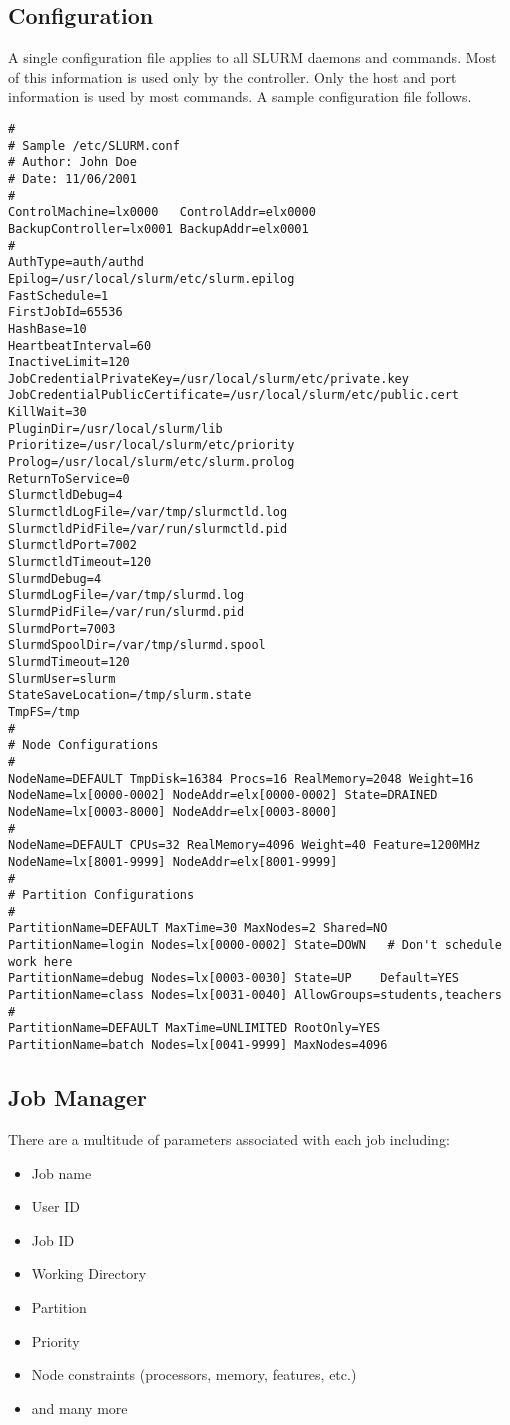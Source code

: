 \subsection{Configuration}

A single configuration file applies to all SLURM daemons and commands.
Most of this information is used only by the controller. 
Only the host and port information is used by most commands.
A sample configuration file follows.

\begin{verbatim}
# 
# Sample /etc/SLURM.conf
# Author: John Doe
# Date: 11/06/2001
#
ControlMachine=lx0000   ControlAddr=elx0000 
BackupController=lx0001 BackupAddr=elx0001
#
AuthType=auth/authd
Epilog=/usr/local/slurm/etc/slurm.epilog
FastSchedule=1
FirstJobId=65536
HashBase=10
HeartbeatInterval=60
InactiveLimit=120
JobCredentialPrivateKey=/usr/local/slurm/etc/private.key
JobCredentialPublicCertificate=/usr/local/slurm/etc/public.cert
KillWait=30
PluginDir=/usr/local/slurm/lib
Prioritize=/usr/local/slurm/etc/priority
Prolog=/usr/local/slurm/etc/slurm.prolog
ReturnToService=0
SlurmctldDebug=4
SlurmctldLogFile=/var/tmp/slurmctld.log
SlurmctldPidFile=/var/run/slurmctld.pid
SlurmctldPort=7002
SlurmctldTimeout=120
SlurmdDebug=4
SlurmdLogFile=/var/tmp/slurmd.log
SlurmdPidFile=/var/run/slurmd.pid
SlurmdPort=7003
SlurmdSpoolDir=/var/tmp/slurmd.spool
SlurmdTimeout=120
SlurmUser=slurm
StateSaveLocation=/tmp/slurm.state
TmpFS=/tmp
#
# Node Configurations
#
NodeName=DEFAULT TmpDisk=16384 Procs=16 RealMemory=2048 Weight=16
NodeName=lx[0000-0002] NodeAddr=elx[0000-0002] State=DRAINED
NodeName=lx[0003-8000] NodeAddr=elx[0003-8000]
#
NodeName=DEFAULT CPUs=32 RealMemory=4096 Weight=40 Feature=1200MHz
NodeName=lx[8001-9999] NodeAddr=elx[8001-9999]
#
# Partition Configurations
#
PartitionName=DEFAULT MaxTime=30 MaxNodes=2 Shared=NO
PartitionName=login Nodes=lx[0000-0002] State=DOWN   # Don't schedule work here
PartitionName=debug Nodes=lx[0003-0030] State=UP    Default=YES
PartitionName=class Nodes=lx[0031-0040] AllowGroups=students,teachers
#
PartitionName=DEFAULT MaxTime=UNLIMITED RootOnly=YES
PartitionName=batch Nodes=lx[0041-9999] MaxNodes=4096
\end{verbatim}

\subsection{Job Manager}

There are a multitude of parameters associated with each job including:
\begin{itemize}
\item Job name
\item User ID
\item Job ID
\item Working Directory
\item Partition
\item Priority
\item Node constraints (processors, memory, features, etc.)
\item and many more
\end{itemize}

